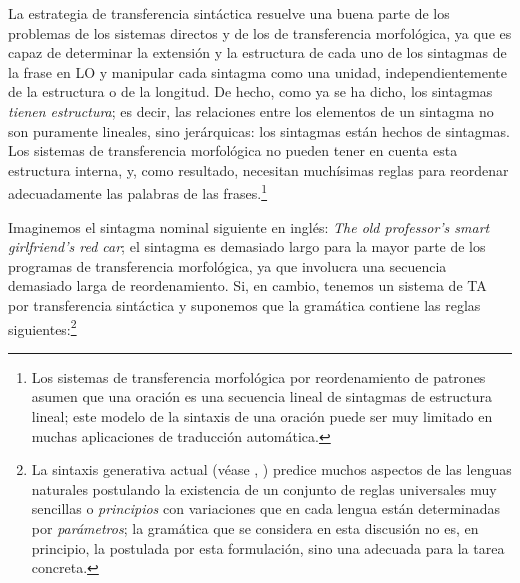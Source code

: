 La estrategia de transferencia sintáctica resuelve una buena parte de los problemas de los sistemas directos y de los de transferencia morfológica, ya que es capaz de determinar la extensión y la estructura de cada uno de los sintagmas de la frase en LO y manipular cada sintagma como una unidad, independientemente de la estructura o de la longitud. De hecho, como ya se ha dicho, los sintagmas \emph{tienen estructura}; es decir, las relaciones entre los elementos de un sintagma no son puramente lineales, sino jerárquicas: los sintagmas están hechos de sintagmas. Los sistemas de transferencia morfológica no pueden tener en cuenta esta estructura interna, y, como resultado, necesitan muchísimas reglas para reordenar adecuadamente las palabras de las frases.\footnote{Los sistemas de transferencia morfológica por reordenamiento de patrones asumen que una oración es una secuencia lineal de sintagmas de estructura lineal; este modelo de la sintaxis de una oración puede ser muy limitado en muchas aplicaciones de traducción automática.} 

Imaginemos el sintagma nominal siguiente en inglés: \emph{The old
  professor's smart girlfriend's red car}; el sintagma es demasiado
largo para la mayor parte de los programas de transferencia
morfológica, ya que involucra una secuencia demasiado larga de
reordenamiento. Si, en cambio, tenemos un sistema de TA por
transferencia sintáctica y suponemos que la gramática contiene las
reglas siguientes:\footnote{La sintaxis generativa actual (véase
  \cite{chomsky96b}, \cite{ramos92}) predice muchos aspectos de las
  lenguas naturales postulando la existencia de un conjunto de reglas
  universales muy sencillas o \emph{principios} con variaciones que en
  cada lengua están determinadas por \emph{parámetros}; la gramática
  que se considera en esta discusión no es, en principio, la postulada
  por esta formulación, sino una adecuada para la tarea concreta.} 

